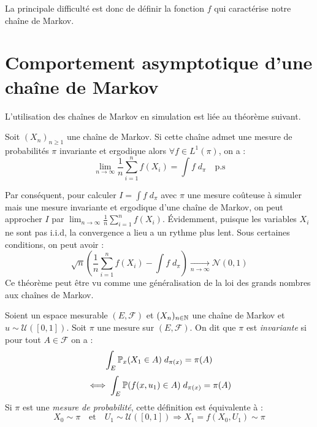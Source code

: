 \begin{remark}
    La principale difficulté est donc de définir la fonction $f$ qui caractérise notre chaîne de Markov. 
\end{remark}


\section{Comportement asymptotique d'une chaîne de Markov}

L'utilisation des chaînes de Markov en simulation est liée au théorème suivant. 

\begin{theorem}
    Soit $(X_n)_{n \geqslant 1}$ une chaîne de Markov. Si cette chaîne admet une mesure de probabilités $ \pi$ invariante 
    et ergodique alors $ \forall f \in L^1( \pi)$, on a : 
        $$ \boxed{ \lim_{n \to \infty} \frac{1}{n} \sum_{i=1}^{n} f(X_i) = \int f \; d_{ \pi} \quad \text{p.s}  } $$
\end{theorem}

Par conséquent, pour calculer $ I = \int f \; d_\pi$ avec $ \pi$ une mesure coûteuse à simuler mais une mesure 
invariante et ergodique d'une chaîne de Markov, on peut approcher $I$ par $ \lim_{n \to \infty} \frac{1}{n} \sum_{i=1}^{n} f(X_i)$. 
Évidemment, puisque les variables $X_i$ ne sont pas i.i.d, la convergence a lieu a un rythme plus lent. Sous certaines 
conditions, on peut avoir : 
    $$ \sqrt{n} \left( \frac{1}{n} \sum_{i=1}^{n} f(X_i) - \int f \; d_\pi  \right) \underset{n \to \infty}{\longrightarrow} \mathcal{N}(0,1) $$
Ce théorème peut être vu comme une généralisation de la loi des grands nombres aux chaînes de Markov. 

\begin{definition}
    Soient un espace mesurable $(E, \mathcal{F} )$ et $(X_n)_{n \in \mathbb{N}}$ une chaîne de Markov et $u \sim \mathcal{U}([0,1])$. 
    Soit $ \pi$ une mesure sur $(E, \mathcal{F}) $. On dit que $ \pi$ est \emph{invariante} si pour tout $A \in \mathcal{F}$ 
    on a : 
        $$ \int_E \mathbb{P}_x(X_1 \in A) \; d_{ \pi(x)} = \pi(A) $$ 
        $$ \iff \int_E \mathbb{P}(f(x,u_1) \in A) \; d_{ \pi(x)} = \pi(A) $$  
    Si $ \pi$ est une \emph{mesure de probabilité}, cette définition est équivalente à : 
        $$ X_0 \sim \pi \quad \text{et} \quad U_1 \sim \mathcal{U}([0,1]) \Longrightarrow X_1 = f(X_0, U_1) \sim \pi $$  
\end{definition}

